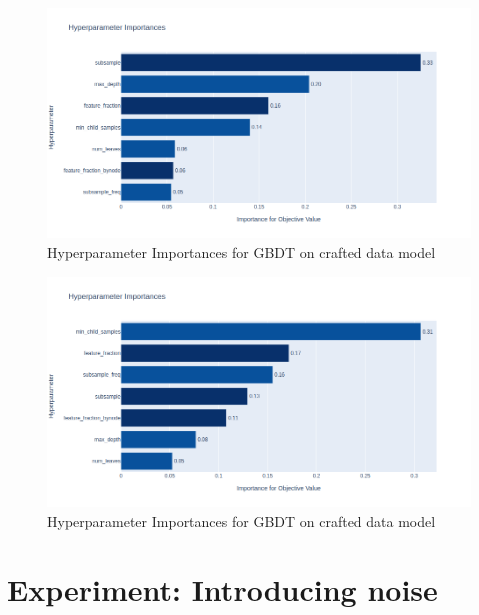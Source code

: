 \begin{figure}[h]
	\centering
	\includegraphics[width=\linewidth]{figures/HPO/RF_HPO_Raw_Importances.png}
	\caption{Hyperparameter Importances for GBDT on crafted data model}
	\label{fig:RF_HPO_Raw_Importances}
\end{figure}
\begin{figure}[h]
	\centering
	\includegraphics[width=\linewidth]{figures/HPO/RF_HPO_Crafted_Importances.png}
	\caption{Hyperparameter Importances for GBDT on crafted data model}
	\label{fig:RF_HPO_Crafted_Importances}
\end{figure}


\section{Experiment: Introducing noise}\label{sec:noise}







